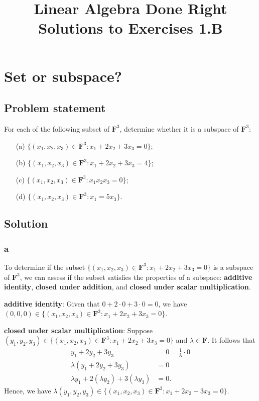 \documentclass{article}
\title{Linear Algebra Done Right\\Solutions to Exercises 1.B}
\author{}
\date{}
\begin{document}
\maketitle

\section{Set or subspace?}
\subsection*{Problem statement}
For each of the following subset of $\mathbf{F}^3$, determine whether it is a subspace of $\mathbf{F}^3$:
\begin{itemize}
  \item[(a)] $\{(x_1,x_2,x_3)\in\mathbf{F}^3:x_1+2x_2+3x_3=0\}$;
  \item[(b)] $\{(x_1,x_2,x_3)\in\mathbf{F}^3:x_1+2x_2+3x_3=4\}$;
  \item[(c)] $\{(x_1,x_2,x_3)\in\mathbf{F}^3:x_1x_2x_3=0\}$;
  \item[(d)] $\{(x_1,x_2,x_3)\in\mathbf{F}^3:x_1=5x_3\}$.
\end{itemize}

\subsection*{Solution}
\subsubsection*{a}
To determine if the subset $\{(x_1,x_2,x_3)\in\mathbf{F}^3:x_1+2x_2+3x_3=0\}$ is a subspace of $\mathbf{F}^3$, we can assess if the subset satisfies the properties of a subspace: \textbf{additive identity}, \textbf{closed under addition}, and \textbf{closed under scalar multiplication}.

\textbf{additive identity}: Given that $0+2\cdot0+3\cdot0=0$, we have \newline $(0,0,0)\in\{(x_1,x_2,x_3)\in\mathbf{F}^3:x_1+2x_2+3x_3=0\}$.

\textbf{closed under scalar multiplication}: Suppose\newline $(y_1,y_2,y_3)\in\{(x_1,x_2,x_3)\in\mathbf{F}^3:x_1+2x_2+3x_3=0\}$ and $\lambda\in\mathbf{F}$. 
It follows that 
\begin{align*}
    y_1+2y_2+3y_3&=0=\frac{1}{\lambda}\cdot0\\
    \lambda(y_1+2y_2+3y_3)&=0\\
    \lambda y_1+2(\lambda y_2)+3(\lambda y_3)&=0.
\end{align*}
Hence, we have $\lambda(y_1,y_2,y_3)\in\{(x_1,x_2,x_3)\in\mathbf{F}^3:x_1+2x_2+3x_3=0\}$.
\end{document}
